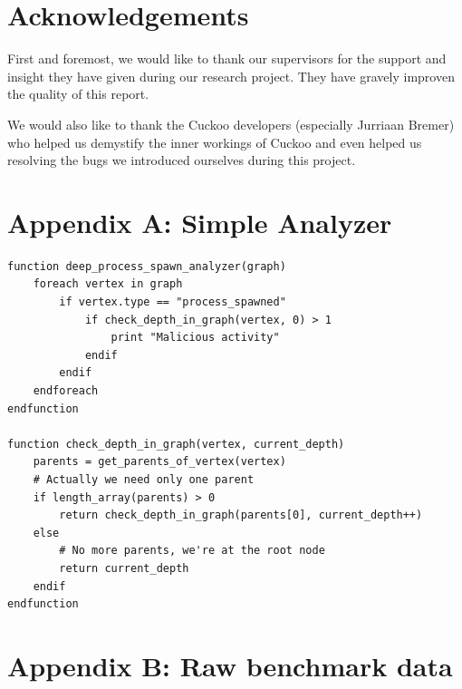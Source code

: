 \documentclass{scrartcl}
\begin{document}
\clearpage

\section*{Acknowledgements}

First and foremost, we would like to thank our supervisors for the support and insight they have given during our research project. They have gravely improven the quality of this report.

We would also like to thank the Cuckoo developers (especially Jurriaan Bremer) who helped us demystify the inner workings of Cuckoo and even helped us resolving the bugs we introduced ourselves during this project.

\clearpage





\clearpage
\section*{Appendix A: Simple Analyzer}

\begin{lstlisting}
function deep_process_spawn_analyzer(graph)
    foreach vertex in graph
        if vertex.type == "process_spawned"
            if check_depth_in_graph(vertex, 0) > 1
                print "Malicious activity"
            endif
        endif
    endforeach
endfunction

function check_depth_in_graph(vertex, current_depth)
    parents = get_parents_of_vertex(vertex)
    # Actually we need only one parent
    if length_array(parents) > 0
        return check_depth_in_graph(parents[0], current_depth++)
    else
        # No more parents, we're at the root node
        return current_depth
    endif
endfunction
\end{lstlisting}

\clearpage

\section*{Appendix B: Raw benchmark data}

\end{document}
